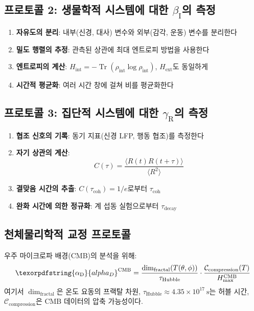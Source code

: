 \documentclass[11pt,a4paper]{article}
\DeclareMathOperator{\Tr}{Tr}
\DeclareRobustCommand{\alD}{\texorpdfstring{\ensuremath{\alpha_{\mathrm{D}}}}{alpha_D}}
\DeclareRobustCommand{\beI}{\texorpdfstring{\ensuremath{\beta_{\mathrm{I}}}}{beta_I}}
\DeclareRobustCommand{\gaR}{\texorpdfstring{\ensuremath{\gamma_{\mathrm{R}}}}{gamma_R}}
\begin{document}
	\subsection{프로토콜 2: 생물학적 시스템에 대한 \beI 의 측정}
	
	\begin{enumerate}
		\item \textbf{자유도의 분리}: 내부(신경, 대사) 변수와 외부(감각, 운동) 변수를 분리한다
		\item \textbf{밀도 행렬의 추정}: 관측된 상관에 최대 엔트로피 방법을 사용한다
		\item \textbf{엔트로피의 계산}: \(H_{\mathrm{int}} = -\Tr(\rho_{\mathrm{int}}\log\rho_{\mathrm{int}})\), \(H_{\mathrm{ext}}\)도 동일하게
		\item \textbf{시간적 평균화}: 여러 시간 창에 걸쳐 비를 평균화한다
	\end{enumerate}
	
	\subsection{프로토콜 3: 집단적 시스템에 대한 \gaR 의 측정}
	
	\begin{enumerate}
		\item \textbf{협조 신호의 기록}: 동기 지표(신경 LFP, 행동 협조)를 측정한다
		\item \textbf{자기 상관의 계산}:
		\[
		C(\tau) = \frac{\langle R(t)R(t+\tau)\rangle}{\langle R^2\rangle}
		\]
		\item \textbf{결맞음 시간의 추출}: \(C(\tau_{\mathrm{coh}}) = 1/e\)로부터 \(\tau_{\mathrm{coh}}\)
		\item \textbf{완화 시간에 의한 정규화}: 계 섭동 실험으로부터 \(\tau_{\mathrm{decay}}\)
	\end{enumerate}
	
	\subsection{천체물리학적 교정 프로토콜}
	\label{subsec:astro-calibration}
	
	우주 마이크로파 배경(CMB)의 분석을 위해:
	\[
	\alD^{\mathrm{CMB}} = \frac{\dim_{\mathrm{fractal}}(T(\theta,\phi))}{\tau_{\mathrm{Hubble}}} \cdot \frac{\mathcal{C}_{\mathrm{compression}}(T)}{H_{\max}^{\mathrm{CMB}}}
	\]
	여기서 \(\dim_{\mathrm{fractal}}\)은 온도 요동의 프랙탈 차원, \(\tau_{\mathrm{Hubble}} \approx 4.35 \times 10^{17}\ \mathrm{s}\)는 허블 시간, \(\mathcal{C}_{\mathrm{compression}}\)은 CMB 데이터의 압축 가능성이다.
	
\end{document}
